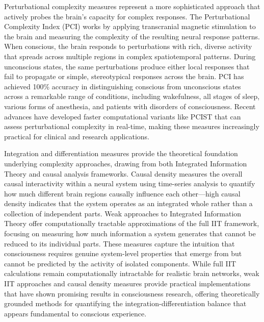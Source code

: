 \documentclass[11pt,a4paper]{article}
\begin{document}
Perturbational complexity measures represent a more sophisticated approach that actively probes the brain's capacity for complex responses. The Perturbational Complexity Index (PCI) works by applying transcranial magnetic stimulation to the brain and measuring the complexity of the resulting neural response patterns. When conscious, the brain responds to perturbations with rich, diverse activity that spreads across multiple regions in complex spatiotemporal patterns. During unconscious states, the same perturbations produce either local responses that fail to propagate or simple, stereotypical responses across the brain. PCI has achieved 100\% accuracy in distinguishing conscious from unconscious states across a remarkable range of conditions, including wakefulness, all stages of sleep, various forms of anesthesia, and patients with disorders of consciousness. Recent advances have developed faster computational variants like PCIST that can assess perturbational complexity in real-time, making these measures increasingly practical for clinical and research applications.

Integration and differentiation measures provide the theoretical foundation underlying complexity approaches, drawing from both Integrated Information Theory and causal analysis frameworks. Causal density measures the overall causal interactivity within a neural system using time-series analysis to quantify how much different brain regions causally influence each other—high causal density indicates that the system operates as an integrated whole rather than a collection of independent parts. Weak approaches to Integrated Information Theory offer computationally tractable approximations of the full IIT framework, focusing on measuring how much information a system generates that cannot be reduced to its individual parts. These measures capture the intuition that consciousness requires genuine system-level properties that emerge from but cannot be predicted by the activity of isolated components. While full IIT calculations remain computationally intractable for realistic brain networks, weak IIT approaches and causal density measures provide practical implementations that have shown promising results in consciousness research, offering theoretically grounded methods for quantifying the integration-differentiation balance that appears fundamental to conscious experience. 
\end{document}
